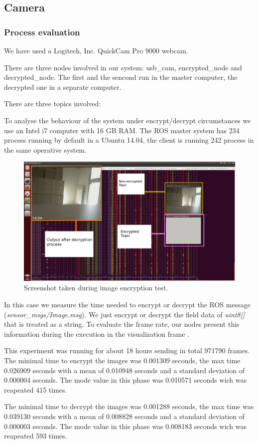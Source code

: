 \documentclass[journal,twoside]{JoPhA}
\begin{document}
\subsection{Camera}


\subsubsection{Process evaluation}

We have used a Logitech, Inc. QuickCam Pro 9000 webcam.

There are three nodes involved in our system: usb\_cam, encrypted\_node and decrypted\_node. The first and the sencond run in the master computer, the decrypted one in a separate computer.

There are three topics involved: 

To analyse the behaviour of the system under encrypt/decrypt circumstances we use an Intel i7 computer with 16 GB RAM. The ROS master system has 234 process running by default in a Ubuntu 14.04, the client is running 242 process in the same operative system.

\begin{figure}[ht]
    \centering
    \includegraphics[width=.5\textwidth]{Screenshot.png}
    \caption{Screenshot taken during image encryption test.}
  \label{fig:screenshot}
\end{figure}

In this case we measure the time needed to encrypt or decrypt the ROS message ({\em sensor\_msgs/Image.msg}). We just encrypt or decrypt the field data of {\em uint8[]} that is treated as a string.
To evaluate  the frame rate, our nodes present this information during the execution in the visualization frame . 

This experiment was running for about 18 hours sending in total 971790 frames. The minimal time to encrypt the images was 0.001309 seconds, the max time  0.026909 seconds with a 
mean of  0.010948 seconds and a standard deviation of 0.000004 seconds. The mode value in this phase was 0.010571 seconds wich was reapeated 415 times. 

The minimal time to decrypt the images was 0.001288 seconds, the max time was 0.039130 seconds with a 
mean of  0.008828 seconds and a standard deviation of 0.000003 seconds. The mode value in this phase was 0.008183 seconds wich was reapeated 593 times. 
\end{document}
